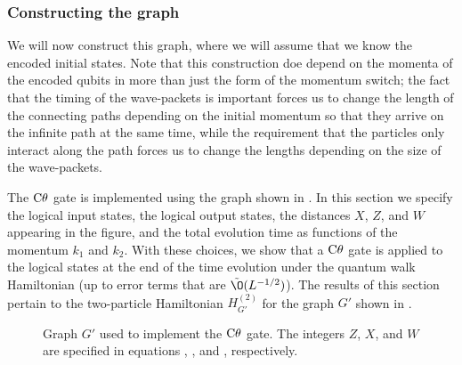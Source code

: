 \documentclass[../thesis-main/thesis-main]{subfiles}
\begin{document}
\subsubsection{Constructing the graph}

We will now construct this graph, where we will assume that we know the encoded initial states.  Note that this construction doe depend on the momenta of the encoded qubits in more than just the form of the momentum switch; the fact that the timing of the wave-packets is important forces us to change the length of the connecting paths depending on the initial momentum so that they arrive on the infinite path at the same time, while the requirement that the particles only interact along the path forces us to change the lengths depending on the size of the wave-packets.

The $\mathrm{C}\theta$ gate is implemented using the graph shown in . In this section we specify the logical input states, the logical output states, the distances $X$, $Z$, and $W$ appearing in the figure, and the total evolution time as functions of the momentum $k_{1}$ and $k_{2}$. With these choices, we show that a $\mathrm{C}\theta$ gate is applied to the logical states at the end of the time evolution under the quantum walk Hamiltonian (up to error terms that are $\tilde{\O}(L^{-{1}/{2}})$). The results of this section pertain to the two-particle Hamiltonian $H^{(2)}_{G'}$ for the graph $G'$ shown in .

\begin{figure}
  \centering
   
  \caption{Graph $G'$ used to implement the $\mathrm{C}\theta$ gate. The integers $Z$, $X$, and $W$ are specified in equations , , and , respectively.}
\label{fig:explicit_cd}
\end{figure}
\end{document}
